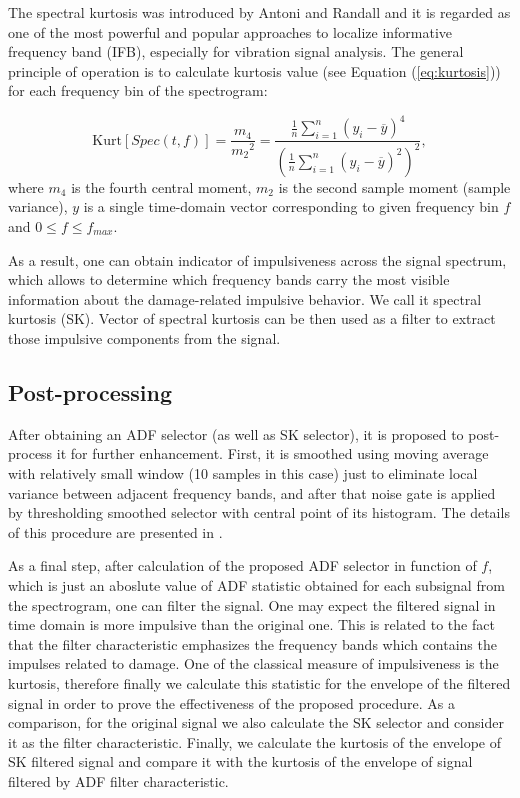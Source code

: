 \documentclass[11pt]{article}
\begin{document}
The spectral kurtosis was introduced by Antoni and Randall \cite{ANTONI2006308,ANTONI2006282} and it is  regarded  as  one  of  the  most  powerful  and  popular approaches to localize informative frequency band (IFB),  especially for  vibration signal analysis. The general principle of operation is to calculate kurtosis value (see Equation (\ref{eq:kurtosis})) for  each  frequency  bin  of  the  spectrogram: 

\begin{equation}
\label{eq:kurtosis}
\textrm{Kurt}[Spec(t,f)]=\frac{m_4}{{m_2}^2}=\frac{\frac{1}{n} \sum_{i=1}^{n} \left(y_i - \overline{y} \right)^4}{\left({\frac{1}{n} \sum_{i=1}^{n} \left(y_i - \overline{y} \right)^2}\right)^2},
\end{equation}
where $m_4$ is the fourth central moment, $m_2$ is the second sample moment (sample variance), $y$ is a single time-domain vector corresponding to given frequency bin $f$ and $0\leq f\leq f_{max}$.

{As a result, one can obtain indicator of impulsiveness across the signal spectrum, which allows to determine which frequency bands carry the most visible information about the damage-related impulsive behavior.  We call it spectral kurtosis (SK). Vector of spectral kurtosis can be then used as a filter to extract those impulsive components from the signal.}

\subsection{Post-processing}
After obtaining an ADF selector (as well as SK selector),  it is proposed to post-process it for further enhancement. First, it is smoothed using moving average with relatively small window (10 samples in this case) just to eliminate local variance between adjacent frequency bands, and after that noise gate is applied by thresholding smoothed selector with central point of its histogram. The details of this procedure are presented in \cite{daponte2003ieee}.


As a final step, after calculation of the proposed ADF selector in function of $f$, which is just an aboslute value of ADF statistic obtained for each subsignal from the spectrogram, one can filter the signal.  One may expect the filtered signal in time domain is more impulsive than the original one. This is related to the fact that the  filter characteristic emphasizes the frequency bands which contains the impulses related to damage. One of the classical measure of impulsiveness is the kurtosis, therefore finally we calculate this statistic for the envelope of the filtered signal in order to prove the effectiveness of the proposed procedure. As a comparison, for the original signal we also calculate the SK selector and consider it as the filter characteristic. Finally, we calculate the kurtosis of the envelope of SK filtered signal and compare it with the kurtosis of the envelope of signal filtered by ADF filter characteristic. 
\end{document}
